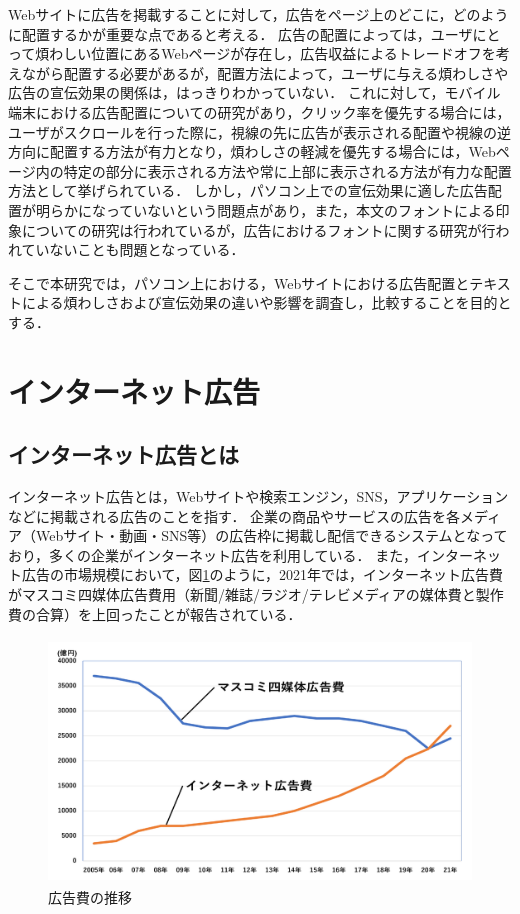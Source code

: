 \documentclass[12pt,a4j,titlepage]{ltjsarticle}
\begin{document}
Webサイトに広告を掲載することに対して，広告をページ上のどこに，どのように配置するかが重要な点であると考える．
広告の配置によっては，ユーザにとって煩わしい位置にあるWebページが存在し，広告収益によるトレードオフを考えながら配置する必要があるが，配置方法によって，ユーザに与える煩わしさや広告の宣伝効果の関係は，はっきりわかっていない．
これに対して，モバイル端末における広告配置についての研究があり，クリック率を優先する場合には，ユーザがスクロールを行った際に，視線の先に広告が表示される配置や視線の逆方向に配置する方法が有力となり，煩わしさの軽減を優先する場合には，Webページ内の特定の部分に表示される方法や常に上部に表示される方法が有力な配置方法として挙げられている\cite{mobile}．
しかし，パソコン上での宣伝効果に適した広告配置が明らかになっていないという問題点があり，また，本文のフォントによる印象についての研究は行われているが，広告におけるフォントに関する研究が行われていないことも問題となっている．

そこで本研究では，パソコン上における，Webサイトにおける広告配置とテキストによる煩わしさおよび宣伝効果の違いや影響を調査し，比較することを目的とする．

\clearpage

\section{インターネット広告}
\subsection{インターネット広告とは}
インターネット広告とは，Webサイトや検索エンジン，SNS，アプリケーションなどに掲載される広告のことを指す．
企業の商品やサービスの広告を各メディア（Webサイト・動画・SNS等）の広告枠に掲載し配信できるシステムとなっており，多くの企業がインターネット広告を利用している．
また，インターネット広告の市場規模において，図\ref{fig:広告費}のように，2021年では，インターネット広告費がマスコミ四媒体広告費用（新聞/雑誌/ラジオ/テレビメディアの媒体費と製作費の合算）を上回ったことが報告されている\cite{dentsu}．

\begin{figure}[h]
\begin{center}
 \includegraphics[height=65mm]{figures/広告費.pdf}
\end{center}
 \caption{広告費の推移}
 \label{fig:広告費}
\end{figure}
\end{document}
